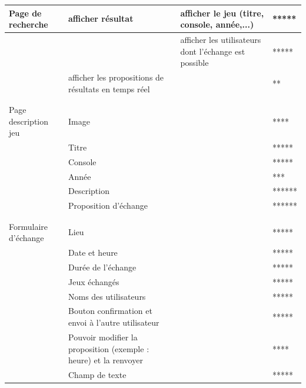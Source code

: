 \documentclass[a4paper,12pt,abstracton,titlepage]{scrartcl}
\begin{document}
\begin{longtable}{|p{}|p{}|p{}|l|}
 \hline
Page de recherche & afficher résultat & afficher le jeu (titre, console, année,...) & *****\\
\hline
 &  & afficher les utilisateurs dont l'échange est possible & *****\\
 \hline
 & afficher les propositions de résultats en temps réel &  & **\\
 \hline
 & & & \\
 \hline
 & & & \\
 \hline
Page description jeu & Image &  & ****\\
 \hline
 & Titre &  & *****\\
 \hline
 & Console &  & *****\\
 \hline
 & Année &  & ***\\
 \hline
 & Description &  & ******\\
 \hline
 & Proposition d'échange &  & ******\\
 \hline
 & & & \\
 \hline
 & & & \\
 \hline
Formulaire d'échange & Lieu &  & *****\\
\hline
 & Date et heure &  & *****\\
 \hline
 & Durée de l'échange &  & *****\\
 \hline
 & Jeux échangés &  & *****\\
 \hline
 & Noms des utilisateurs &  & *****\\
 \hline
 & Bouton confirmation et envoi à l'autre utilisateur &  & *****\\
 \hline
 & Pouvoir modifier la proposition (exemple : heure) et la renvoyer &  & ****\\
 \hline
 & Champ de texte &  & *****\\
  \hline
\end{longtable}
\end{document}
